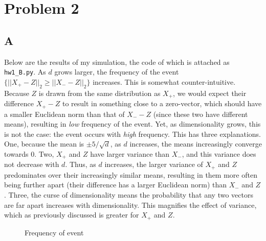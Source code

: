 \documentclass{article}
\begin{document}
\section*{Problem 2}

\subsection*{A}

Below are the results of my simulation, the code of which is attached as
\texttt{hw1\_B.py}. As $d$ grows larger, the frequency of the event $\{||X_+ -
Z||_2 \geq ||X_{-} - Z||_2\}$ increases. This is somewhat counter-intuitive.
Because $Z$ is drawn from the same distribution as $X_+$, we would expect their
difference $X_+ - Z$ to result in something close to a zero-vector, which should
have a smaller Euclidean norm than that of $X_- - Z$
(since these two have different
means), resulting in \textit{low}
frequency of the event. Yet, as dimensionality grows,
this is not the case: the event occurs with \textit{high} frequency. This has three
explanations. One, because the mean is $\pm 5/\sqrt{d}$, as $d$ increases, the
means increasingly converge towards 0. Two, $X_+$ and $Z$ have larger variance than
$X_-$, and this variance does not decrease with $d$. Thus, as $d$ increases, the
larger variance of $X_+$ and $Z$ predominates over their increasingly similar
means, resulting in them more often being further apart (their difference has a
larger Euclidean norm) than $X_-$ and $Z$. Three, the curse of dimensionality
means the probability that any two vectors are far apart increases with
dimensionality. This magnifies the effect of variance, which as previously
discussed is greater for $X_+$ and $Z$.

\begin{figure}[h]
	\centering
	\caption{Frequency of event}
\end{figure}
\end{document}
